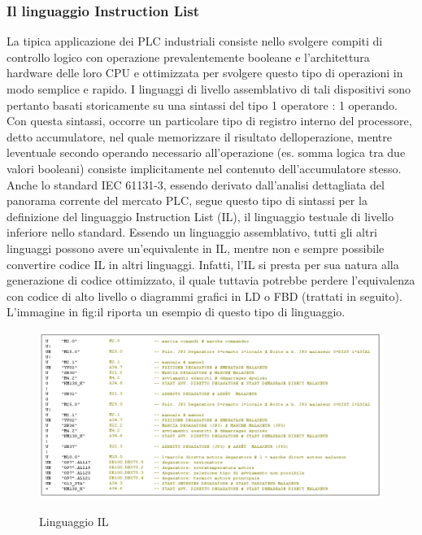 \documentclass[12pt, a4paper, oneside]{book}
\begin{document}
\subsubsection{Il linguaggio Instruction List}
La tipica applicazione dei PLC industriali consiste nello svolgere compiti di controllo logico con operazione prevalentemente booleane e l’architettura hardware delle loro CPU e ottimizzata per svolgere questo tipo di operazioni in modo semplice e rapido. I linguaggi di livello assemblativo di tali dispositivi sono pertanto basati storicamente su una sintassi del tipo 1 operatore : 1 operando. Con questa sintassi, occorre un particolare tipo di registro interno del processore, detto accumulatore,
nel quale memorizzare il risultato delloperazione, mentre leventuale secondo operando necessario all’operazione (es. somma logica tra due valori booleani) consiste implicitamente nel contenuto dell’accumulatore stesso. Anche lo standard IEC 61131-3, essendo derivato dall’analisi dettagliata del panorama corrente del mercato PLC, segue questo tipo di sintassi per la definizione del linguaggio
Instruction List (IL), il linguaggio testuale di livello inferiore nello standard.
Essendo un linguaggio assemblativo, tutti gli altri linguaggi possono avere un’equivalente in IL, mentre non e sempre possibile convertire codice IL in altri linguaggi. Infatti, l’IL si presta per sua natura alla generazione di codice ottimizzato, il quale tuttavia potrebbe perdere l’equivalenza con codice di alto livello o diagrammi grafici in LD o FBD (trattati in seguito). 
L’immagine in fig:il riporta un esempio di questo tipo di linguaggio.

	\begin{figure}[H]
	\centering
	\includegraphics[width=12cm]{Immagini/IL}
	\label{IL}
	\caption{Linguaggio IL}
\end{figure}
\end{document}
